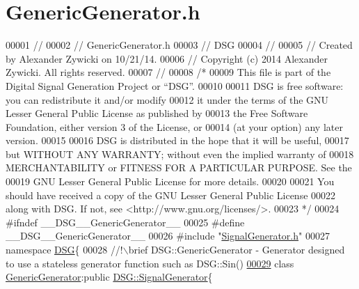 \hypertarget{_generic_generator_8h_source}{\section{Generic\+Generator.\+h}
\label{_generic_generator_8h_source}
}

\begin{DoxyCode}
00001 \textcolor{comment}{//}
00002 \textcolor{comment}{//  GenericGenerator.h}
00003 \textcolor{comment}{//  DSG}
00004 \textcolor{comment}{//}
00005 \textcolor{comment}{//  Created by Alexander Zywicki on 10/21/14.}
00006 \textcolor{comment}{//  Copyright (c) 2014 Alexander Zywicki. All rights reserved.}
00007 \textcolor{comment}{//}
00008 \textcolor{comment}{/*}
00009 \textcolor{comment}{ This file is part of the Digital Signal Generation Project or “DSG”.}
00010 \textcolor{comment}{}
00011 \textcolor{comment}{ DSG is free software: you can redistribute it and/or modify}
00012 \textcolor{comment}{ it under the terms of the GNU Lesser General Public License as published by}
00013 \textcolor{comment}{ the Free Software Foundation, either version 3 of the License, or}
00014 \textcolor{comment}{ (at your option) any later version.}
00015 \textcolor{comment}{}
00016 \textcolor{comment}{ DSG is distributed in the hope that it will be useful,}
00017 \textcolor{comment}{ but WITHOUT ANY WARRANTY; without even the implied warranty of}
00018 \textcolor{comment}{ MERCHANTABILITY or FITNESS FOR A PARTICULAR PURPOSE.  See the}
00019 \textcolor{comment}{ GNU Lesser General Public License for more details.}
00020 \textcolor{comment}{}
00021 \textcolor{comment}{ You should have received a copy of the GNU Lesser General Public License}
00022 \textcolor{comment}{ along with DSG.  If not, see <http://www.gnu.org/licenses/>.}
00023 \textcolor{comment}{ */}
00024 \textcolor{preprocessor}{#ifndef \_\_DSG\_\_GenericGenerator\_\_}
00025 \textcolor{preprocessor}{#define \_\_DSG\_\_GenericGenerator\_\_}
00026 \textcolor{preprocessor}{#include "\hyperlink{_signal_generator_8h}{SignalGenerator.h}"}
00027 \textcolor{keyword}{namespace }\hyperlink{namespace_d_s_g}{DSG}\{\textcolor{comment}{}
00028 \textcolor{comment}{    //!\(\backslash\)brief DSG::GenericGenerator - Generator designed to use a stateless generator function such as
       DSG::Sin()}
\hypertarget{_generic_generator_8h_source_l00029}{}\hyperlink{class_d_s_g_1_1_generic_generator}{00029} \textcolor{comment}{}    \textcolor{keyword}{class }\hyperlink{class_d_s_g_1_1_generic_generator}{GenericGenerator}:\textcolor{keyword}{public} \hyperlink{class_d_s_g_1_1_signal_generator}{DSG::SignalGenerator}\{

\end{DoxyCode}
